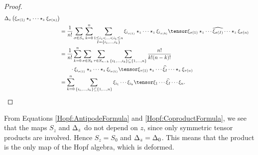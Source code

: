 \begin{proof}
\begin{align*}
		\ocoproduct_z \left( 
			\xi_{\sigma(1)} 
			\star_z \cdots \star_z 
			\xi_{\sigma(n)}
		\right)
		\\
		& =
		\frac{1}{n!}
		\sum\limits_{\sigma \in S_n}
		\sum\limits_{k=0}^n
		\sum\limits_{\substack{
			1 \leq i_1
			< \ldots <
			i_k \leq n
			\\
			I = \{i_1, \ldots, i_k\}
		}}
		\xi_{i_{\sigma(1)}} 
		\star_z \cdots \star_z
		\xi_{i_{\sigma(k)}}
		\tensor
		\xi_{\sigma(1)}
		\star_z \cdots
		\widehat{\xi_{\sigma(I)}}
		\cdots \star_z 
		\xi_{\sigma(n)}
		\\
		& =
		\frac{1}{n!}
		\sum\limits_{k=0}^n
		\sum\limits_{\sigma \in S_k}
		\sum\limits_{\tau \in S_{n - k}}
		\sum\limits_{
			\{i_1, \ldots, i_k\}
			\subseteq
			\{1, \ldots, n\}
		}
		\frac{n!}{k! (n - k)!}
		\\
		& \qquad
		\cdot
		\xi_{i_{\sigma(1)}} 
		\star_z \cdots \star_z 
		\xi_{i_{\sigma(k)}}
		\tensor
		\xi_{\tau(1)}
		\star_z \cdots 
		\widehat{\xi_I}
		\cdots \star_z 
		\xi_{\tau(n)}
		\\
		& =
		\sum\limits_{k=0}^n
		\sum\limits_{
			\{i_1, \ldots, i_k\}
			\subseteq
			\{1, \ldots, n\}
		}
		\xi_{i_1} \cdots \xi_{i_k}
		\tensor
		\xi_1 \cdots \widehat{\xi_I} \cdots \xi_n.
	\end{align*}
\end{proof}
\begin{remark}
	From Equations \ref{Hopf:AntipodeFormula} and 
	\ref{Hopf:CoproductFormula}, we see that the maps $S_z$ and 
	$\Delta_z$ do not depend on $z$, since only symmetric tensor products 
	are involved. Hence $S_z = S_0$ and $\Delta_z = \Delta_0$. 
	This means that the product is the only map of the Hopf algebra, which is 
	deformed.
\end{remark}
%


